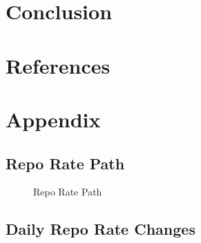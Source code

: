 \documentclass[
  letterpaper,
  DIV=11,
  numbers=noendperiod]{scrartcl}
\begin{document}
\section{Conclusion}\label{conclusion}

\newpage

\section*{References}\label{references}

\renewcommand{\bibsection}{}


\setcounter{section}{0}
\renewcommand{\thesection}{\Alph{section}}

\setcounter{table}{0}
\renewcommand{\thetable}{A\arabic{table}}

\setcounter{figure}{0}
\renewcommand{\thefigure}{A\arabic{figure}}

\newpage

\section{Appendix}\label{appendix}

\subsection{Repo Rate Path}\label{repo-rate-path}

\begin{figure}[H]


\caption{\label{fig-repo_rate}Repo Rate Path}

\end{figure}%

\subsection{Daily Repo Rate Changes}\label{daily-repo-rate-changes}
\end{document}
